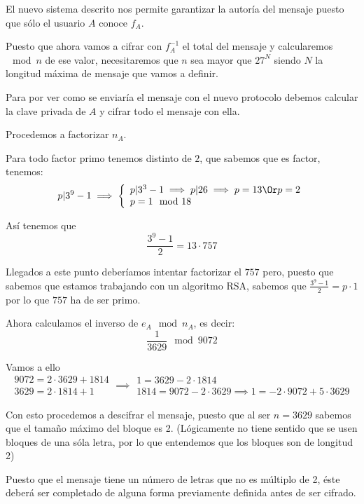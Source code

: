\begin{problem}[5]
El nuevo sistema descrito nos permite garantizar la autoría del mensaje puesto que sólo el usuario $A$ conoce $f_A$.

Puesto que ahora vamos a cifrar con $f_A^{-1}$ el total del mensaje y calcularemos $\mod n$ de ese valor, necesitaremos que $n$ sea mayor que $27^N$ siendo $N$ la longitud máxima de mensaje que vamos a definir.

\spart

Para por ver como se enviaría el mensaje con el nuevo protocolo debemos calcular la clave privada de $A$ y cifrar todo el mensaje con ella.

Procedemos a factorizar $n_A$.

Para todo factor primo tenemos distinto de $2$, que sabemos que es factor, tenemos:
\[p|3^{9}-1 \implies \left\{ \begin{array}{l}
p|3^3-1\implies p|26 \implies p =13 \Or p=2\\
p =1 \mod 18 \end{array}\right.\]

Así tenemos que
\[\frac{3^9-1}{2} = 13 \cdot 757\]

Llegados a este punto deberíamos intentar factorizar el $757$ pero, puesto que sabemos que estamos trabajando con un algoritmo RSA, sabemos que $\frac{3^9-1}{2}=p\cdot 1$ por lo que $757$ ha de ser primo.

Ahora calculamos el inverso de $e_A \mod n_A$, es decir:
\[\frac{1}{3629} \mod 9072\]

Vamos a ello
\[
\begin{array}{l}
9072 = 2 \cdot 3629 + 1814\\
3629 = 2\cdot 1814 + 1
\end{array} \implies \begin{array}{l}
1 = 3629 - 2 \cdot 1814 \\
1814 = 9072 - 2 \cdot 3629 \implies 1 = -2\cdot 9072 + 5\cdot 3629
\end{array}
\]

Con esto procedemos a descifrar el mensaje, puesto que al ser $n=3629$ sabemos que el tamaño máximo del bloque es 2. (Lógicamente no tiene sentido que se usen bloques de una sóla letra, por lo que entendemos que los bloques son de longitud 2)

Puesto que el mensaje tiene un número de letras que no es múltiplo de 2, éste deberá ser completado de alguna forma previamente definida antes de ser cifrado.

\end{problem}


